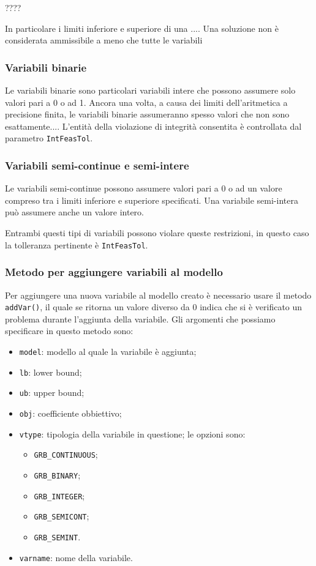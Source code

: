 ????

In particolare i limiti inferiore e superiore di una ....
Una soluzione non è considerata ammissibile a meno che tutte le variabili 

\subsubsection*{Variabili binarie}
Le variabili binarie sono particolari variabili intere che possono assumere solo valori pari a 0 o ad 1.
Ancora una volta, a causa dei limiti dell'aritmetica a precisione finita, le variabili binarie assumeranno spesso valori che non sono esattamente....
L'entità della violazione di integrità consentita è controllata dal parametro \texttt{IntFeasTol}.

\subsubsection*{Variabili semi-continue e semi-intere}
Le variabili semi-continue possono assumere valori pari a 0 o ad un valore compreso tra i limiti inferiore e superiore specificati.
Una variabile semi-intera può assumere anche un valore intero.

Entrambi questi tipi di variabili possono violare queste restrizioni, in questo caso la tolleranza pertinente è \texttt{IntFeasTol}.

\subsubsection*{Metodo per aggiungere variabili al modello}
Per aggiungere una nuova variabile al modello creato è necessario usare il metodo \texttt{addVar()}, il quale se ritorna un valore diverso da 0 indica che si è verificato un problema durante l'aggiunta della variabile.
Gli argomenti che possiamo specificare in questo metodo sono:
\begin{itemize}
\item \texttt{model}: modello al quale la variabile è aggiunta;
\item \texttt{lb}: lower bound;
\item \texttt{ub}: upper bound;
\item \texttt{obj}: coefficiente obbiettivo;
\item \texttt{vtype}: tipologia della variabile in questione;
le opzioni sono:
\begin{itemize}
\item \texttt{GRB\_CONTINUOUS};
\item \texttt{GRB\_BINARY};
\item \texttt{GRB\_INTEGER};
\item \texttt{GRB\_SEMICONT};
\item \texttt{GRB\_SEMINT}.
\end{itemize}
\item \texttt{varname}: nome della variabile.
\end{itemize}

